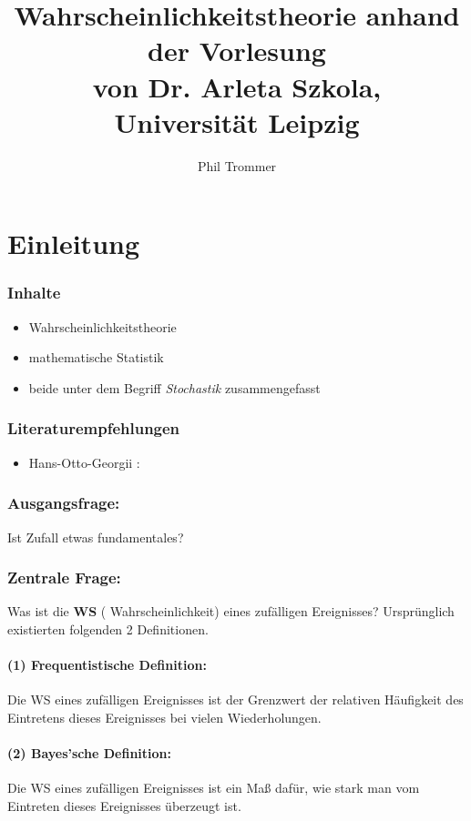 \documentclass[12pt,a4paper]{article}
\author{Phil Trommer}
\title{Wahrscheinlichkeitstheorie anhand der Vorlesung  \\von Dr. Arleta Szkola,\\ Universität Leipzig}
\newcommand{\newpara}{\vskip 0.5cm}
\begin{document}
\setlength{\parindent}{0cm}
\maketitle
\thispagestyle{empty}

\newpage

\tableofcontents

\newpage
\part{Einleitung}
	\section*{Inhalte}
	\begin{itemize}
		\item Wahrscheinlichkeitstheorie
		\item mathematische Statistik
		\item beide unter dem Begriff \textit{Stochastik} zusammengefasst
	\end{itemize}
\newpara
	\section*{Literaturempfehlungen}
	\begin{itemize}
		\item Hans-Otto-Georgii : 
	\end{itemize}
\newpara
	\section*{Ausgangsfrage:}
		Ist Zufall etwas fundamentales?
	\section*{Zentrale Frage: }
		Was ist die \textbf{WS} ( Wahrscheinlichkeit) eines zufälligen Ereignisses? \newline
		Ursprünglich existierten folgenden 2 Definitionen.
		\subsection*{(1) Frequentistische Definition: }
			Die WS eines zufälligen Ereignisses ist der Grenzwert der relativen Häufigkeit des Eintretens 						dieses Ereignisses bei vielen Wiederholungen.
		\subsection*{(2) Bayes'sche Definition: }
			Die WS eines zufälligen Ereignisses ist ein Maß dafür, wie stark man vom Eintreten dieses 							Ereignisses überzeugt ist.
\end{document}
